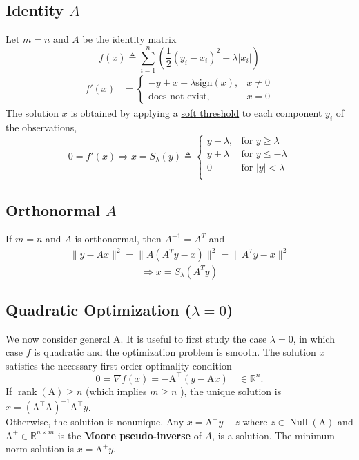 \documentclass[11pt]{elegantbook}
\begin{document}
\subsection{Identity $A$}
Let $m = n$ and $A$ be the identity matrix
$$
f(x) \triangleq \sum_{i=1}^n\left(\frac{1}{2}(y_i-x_i)^2+\lambda |x_i|\right)
$$
\begin{equation}
    \begin{aligned}
        f'(x)&=\left\{\begin{matrix}
            -y+x+\lambda \text{sign}(x),&x\neq 0\\
            \text{does not exist},&x=0
        \end{matrix}\right.
    \end{aligned}
    \nonumber
\end{equation}
The solution $x$ is obtained by applying a \underline{soft threshold} to each component $y_i$ of the observations,
$$0=f'(x) \Rightarrow x=S_\lambda (y)\triangleq\left\{\begin{matrix}y-\lambda,&\text{for }y\geq \lambda\\
y+\lambda&\text{for }y\leq -\lambda\\
0&\text{for }|y|< \lambda\\
\end{matrix}\right.$$

\subsection{Orthonormal $A$}
If $m = n$ and $A$ is orthonormal, then $A^{-1} = A^T$ and
\begin{equation}
    \begin{aligned}
        \|y-Ax\|^2=\|A(A^Ty-x)\|^2=\|A^Ty-x\|^2
    \end{aligned}
    \nonumber
\end{equation}
$$\Rightarrow x=S_\lambda (A^Ty)$$

\subsection{Quadratic Optimization ($\lambda=0$)}
We now consider general A. It is useful to first study the case $\lambda=0$, in which case $f$ is quadratic and the optimization problem is smooth. The solution $x$ satisfies the necessary first-order optimality condition
$$
0=\nabla f(x)=-\mathrm{A}^{\top}(y-\mathrm{A} x) \quad \in \mathbb{R}^n .
$$
If $\operatorname{rank}(\mathrm{A}) \geq n$ (which implies $m \geq n$ ), the unique solution is $x=\left(\mathrm{A}^{\top} \mathrm{A}\right)^{-1} \mathrm{A}^{\top} y$.\\
Otherwise, the solution is nonunique. Any $x=\mathrm{A}^{+} y+z$ where $z \in \operatorname{Null}(\mathrm{A})$ and $\mathrm{A}^{+} \in \mathbb{R}^{n \times m}$ is the \textbf{Moore pseudo-inverse} of $A$, is a solution. The minimum-norm solution is $x=\mathrm{A}^{+} y$.
\end{document}
